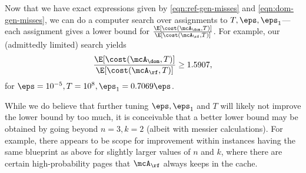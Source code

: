 Now that we have exact expressions given by \eqref{eqn:ref-gen-misses} and \eqref{eqn:dom-gen-misses}, we can do a computer search over assignments to $T, \eps, \eps_1$---each assignment gives a lower bound for $\frac{\E[\cost(\mcA_\dom, T)]}{\E[\cost(\mcA_\rf, T)]}$. For example, our (admittedly limited) search yields
\begin{align*}
    \frac{\E[\cost(\mcA_\dom, T)]}{\E[\cost(\mcA_\rf, T)]} \ge 1.5907,
\end{align*}
for $\eps=10^{-5}, T=10^8, \eps_1=0.7069\eps$.

\begin{remark}
    \label{remark:potential-improving-lower-bound}
    While we do believe that further tuning $\eps, \eps_1$ and $T$ will likely not improve the lower bound by too much, it is conceivable that a better lower bound may be obtained by going beyond $n=3, k=2$ (albeit with messier calculations). For example, there appears to be scope for improvement within instances having the same blueprint as above for slightly larger values of $n$ and $k$, where there are certain high-probability pages that $\mcA_\rf$ always keeps in the cache.
\end{remark}
